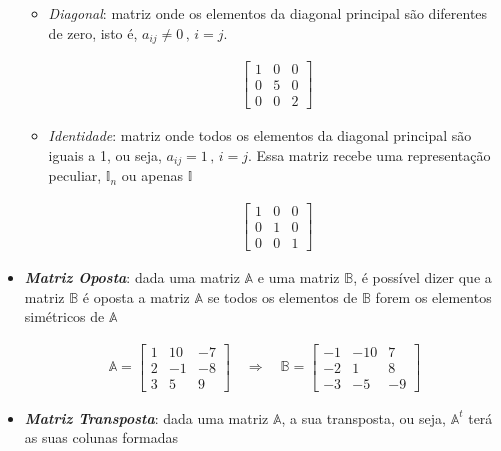 \begin{itemize}
\begin{itemize}
		\item \textit{Diagonal}: matriz onde os elementos da diagonal principal são diferentes de zero, isto é, $a_{ij} \ne 0 \, ,\, i=j$.
		\begin{ceqn}
			\begin{align*}
			\begin{bmatrix}1 & 0 & 0\\
			0 & 5 & 0\\
			0 & 0 & 2
			\end{bmatrix}
			\end{align*}
		\end{ceqn}
		\item \textit{Identidade}: matriz onde todos os elementos da diagonal principal são iguais a 1, ou seja, $a_{ij}=1\, ,\, i=j$. Essa matriz recebe uma representação peculiar, $\mathbb{I}_n$ ou apenas $\mathbb{I}$
		\begin{ceqn}
			\begin{align*}
			\begin{bmatrix}1 & 0 & 0\\
			0 & 1 & 0\\
			0 & 0 & 1
			\end{bmatrix}
			\end{align*}
		\end{ceqn}
	\end{itemize}
	\item \textit{\textbf{Matriz Oposta}}: dada uma matriz $\mathbb{A}$ e uma matriz $\mathbb{B}$, é possível dizer que a matriz $\mathbb{B}$
	é oposta a matriz $\mathbb{A}$ se todos os elementos de $\mathbb{B}$ forem os elementos simétricos de $\mathbb{A}$
	\begin{ceqn}
		\begin{align*}
		\mathbb{A}=\begin{bmatrix}1 & 10 & -7\\
		2 & -1 & -8\\
		3 & 5 & 9
		\end{bmatrix}\quad\Rightarrow\quad\mathbb{B}=\begin{bmatrix}-1 & -10 & 7\\
		-2 & 1 & 8\\
		-3 & -5 & -9
		\end{bmatrix}
		\end{align*}
	\end{ceqn}
	\item \textit{\textbf{Matriz Transposta}}: dada uma matriz $\mathbb{A}$, a sua transposta, ou seja, $\mathbb{A}^t$ terá as suas colunas formadas

\end{itemize}
